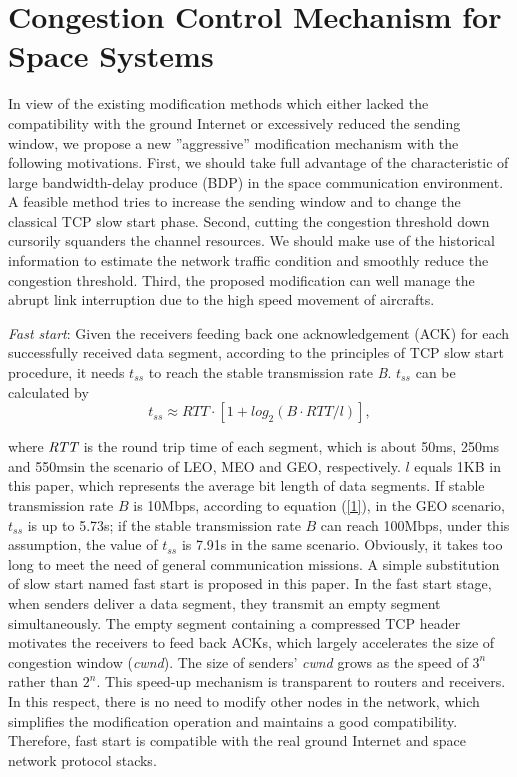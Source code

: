 \documentclass[draftclsnofoot,onecolumn,11pt]{IEEEtran}
\begin{document}
\section{Congestion Control Mechanism for Space Systems}
 In view of the existing modification methods which either lacked the compatibility with the ground Internet or excessively reduced the sending window, we propose a new ''aggressive'' modification mechanism with the following motivations. First, we should take full advantage of the characteristic of large bandwidth-delay produce (BDP) in the space communication environment. A feasible method tries to increase the sending window and to change the classical TCP slow start phase. Second, cutting the congestion threshold down cursorily squanders the channel resources. We should make use of the historical information to estimate the network traffic condition and smoothly reduce the congestion threshold. Third, the proposed modification can well manage the abrupt link interruption due to the high speed movement of aircrafts.

 \emph{Fast start}: Given the receivers feeding back one acknowledgement (ACK) for each successfully received data segment, according to the principles of TCP slow start procedure, it needs $t_{ss}$ to reach the stable transmission rate \emph{B}. $t_{ss}$ can be calculated by
\begin{equation}\label{1}
t_{ss}\approx RTT\cdot[1+log_2(B\cdot RTT/l)],
\end{equation}

 \noindent where $\emph{RTT}$ is the round trip time of each segment, which is about 50ms, 250ms and 550msin the scenario of LEO, MEO and GEO, respectively. $l$ equals 1KB in this paper, which represents the average bit length of data segments. If stable transmission rate $B$ is 10Mbps, according to equation (\ref{1}), in the GEO scenario, $t_{ss}$ is up to 5.73s; if the stable transmission rate $B$ can reach 100Mbps, under this assumption, the value of $t_{ss}$ is 7.91s in the same scenario. Obviously, it takes too long to meet the need of general communication missions. A simple substitution of slow start named fast start is proposed in this paper. In the fast start stage, when senders deliver a data segment, they transmit an empty segment simultaneously. The empty segment containing a compressed TCP header motivates the receivers to feed back ACKs, which largely accelerates the size of congestion window (\emph{cwnd}). The size of senders' \emph{cwnd} grows as the speed of $3^n$ rather than $2^n$. This speed-up mechanism is transparent to routers and receivers. In this respect, there is no need to modify other nodes in the network, which simplifies the modification operation and maintains a good compatibility. Therefore, fast start is compatible with the real ground Internet and space network protocol stacks.
\end{document}
